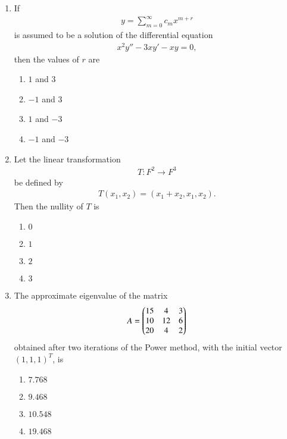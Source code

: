 \documentclass[journal]{IEEEtran}
\numberwithin{equation}{enumi}
\numberwithin{figure}{enumi}
\begin{document}
\begin{enumerate}
\item
If
\begin{align}
y = \sum_{m=0}^\infty c_m x^{m+r}
\end{align}
is assumed to be a solution of the differential equation
\begin{align}
x^2 y'' - 3 x y' - x y = 0,
\end{align}
then the values of $r$ are
\hfill{}
\begin{multicols}{2}
\begin{enumerate}
  \item $1$ and $3$
  \item $-1$ and $3$
  \item $1$ and $-3$
  \item $-1$ and $-3$
\end{enumerate}
\end{multicols}

\item
Let the linear transformation 
\begin{align}
T : F^2 \to F^3
\end{align}
be defined by
\begin{align}
T(x_1, x_2) = (x_1 + x_2, x_1, x_2).
\end{align}
Then the nullity of $T$ is
\hfill{}
\begin{multicols}{4}
\begin{enumerate}
  \item $0$
  \item $1$
  \item $2$
  \item $3$
\end{enumerate}
\end{multicols}

\item
The approximate eigenvalue of the matrix
\begin{align}
A = \begin{pmatrix}
15 & 4 & 3 \\
10 & 12 & 6 \\
20 & 4 & 2
\end{pmatrix}
\end{align}
obtained after two iterations of the Power method, with the initial vector $(1,1,1)^T$, is
\hfill{}
\begin{multicols}{4}
\begin{enumerate}
  \item $7.768$
  \item $9.468$
  \item $10.548$
  \item $19.468$
\end{enumerate}
\end{multicols}


\end{enumerate}
\end{document}

